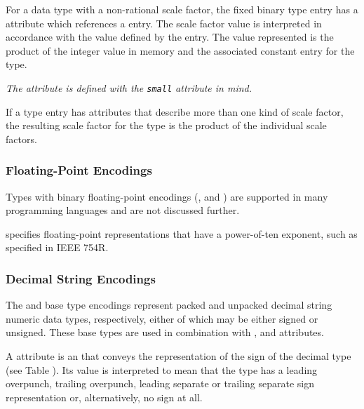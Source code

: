 For\hypertarget{chap:DWATsmallscalefactorforfixedpointtype}{}
a data type with a
\bb
non-rational
\eb
scale factor,
the fixed binary type entry has a \DWATsmallDEFN{} attribute which
 references a
\DWTAGconstant{} entry. The scale factor value
is interpreted in accordance with the value defined by the
\DWTAGconstant{} entry. The value represented is the product
of the integer value in memory and the associated constant
entry for the type.

\textit{The \DWATsmall{} attribute is defined with the
 \texttt{small} attribute in mind.}

\bb
If a type entry has attributes that describe more than one kind of scale
factor, 
the resulting scale factor for the type is the product of the
individual scale factors.
\eb

\subsubsection{Floating-Point Encodings}
\label{chap:floatingpointencodings}
Types with binary floating-point encodings
(\DWATEfloat{}, \DWATEcomplexfloat{} and \DWATEimaginaryfloat{})
are supported in many
programming languages and are not discussed further.

\DWATEdecimalfloat{} specifies
floating-point representations that have a power-of-ten
exponent, such as specified in IEEE 754R.

\subsubsection{Decimal String Encodings}
\label{chap:decimalstringencodings}
The \DWATEpackeddecimalDEFN{} and \DWATEnumericstringDEFN{}
base type encodings
represent packed and unpacked decimal string numeric data
types, respectively, either of which may be either
signed
or
unsigned. These
base types are used in combination with
\DWATdecimalsign,
\DWATdigitcount{} and
\DWATdecimalscale{}
attributes.

A\hypertarget{chap:DWATdecimalsigndecimalsignrepresentation}{}
\DWATdecimalsignDEFN{} attribute
is an  that
conveys the representation of the sign of the decimal type
(see Table ).
Its  value is interpreted to
mean that the type has a leading overpunch, trailing overpunch,
leading separate or trailing separate sign representation or,
alternatively, no sign at all.

